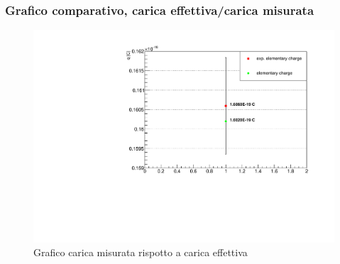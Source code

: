 \subsubsection{Grafico comparativo, carica effettiva/carica misurata}
\begin{figure}[H]
    \centering
    \includegraphics[width=\textwidth,height=\textheight,keepaspectratio]{graph2.pdf}
    \caption{Grafico carica misurata rispotto a carica effettiva}
\end{figure}